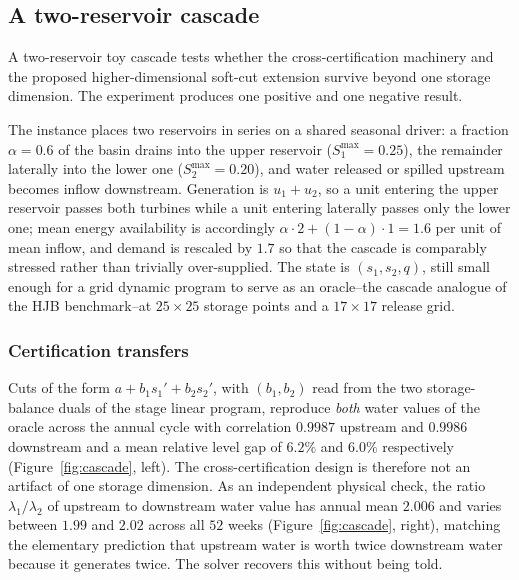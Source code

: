 \documentclass[pdflatex,sn-mathphys-num]{sn-jnl}
\theoremstyle{thmstyleone}
\theoremstyle{thmstyletwo}
\theoremstyle{thmstylethree}
\begin{document}
\subsection{A two-reservoir cascade}
\label{sec:cascade}

A two-reservoir toy cascade tests whether the cross-certification machinery
and the proposed higher-dimensional soft-cut extension survive beyond one
storage dimension. The experiment produces one positive and one negative
result.

The instance places two reservoirs in series on a shared seasonal driver: a
fraction $\alpha=0.6$ of the basin drains into the upper reservoir
($S_1^{\max}=0.25$), the remainder laterally into the lower one
($S_2^{\max}=0.20$), and water released or spilled upstream becomes inflow
downstream. Generation is $u_1+u_2$, so a unit entering the upper reservoir
passes both turbines while a unit entering laterally passes only the lower
one; mean energy availability is accordingly
$\alpha\cdot2+(1-\alpha)\cdot1=1.6$ per unit of mean inflow, and demand is
rescaled by $1.7$ so that the cascade is comparably stressed rather than
trivially over-supplied. The state is $(s_1,s_2,q)$, still small enough for
a grid dynamic program to serve as an oracle--the cascade analogue of the
HJB benchmark--at $25\times25$ storage points and a $17\times17$ release
grid.

\subsubsection*{Certification transfers} Cuts of the form
$a+b_1s_1'+b_2s_2'$, with $(b_1,b_2)$ read from the two storage-balance
duals of the stage linear program, reproduce \emph{both} water values of the
oracle across the annual cycle with correlation $0.9987$ upstream and
$0.9986$ downstream and a mean relative level gap of $6.2\%$ and $6.0\%$
respectively (Figure~\ref{fig:cascade}, left). The cross-certification
design is therefore not an artifact of one storage dimension. As an
independent physical check, the ratio $\lambda_1/\lambda_2$ of upstream to
downstream water value has annual mean $2.006$ and varies between $1.99$
and $2.02$ across all $52$ weeks (Figure~\ref{fig:cascade}, right),
matching the elementary prediction that upstream water is worth twice
downstream water because it generates twice. The solver recovers this
without being told.
\end{document}
